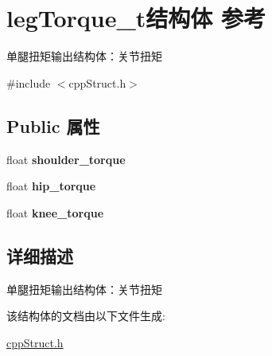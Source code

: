 \hypertarget{structlegTorque__t}{}\section{leg\+Torque\+\_\+t结构体 参考}
\label{structlegTorque__t}


单腿扭矩输出结构体：关节扭矩  




{\ttfamily \#include $<$cpp\+Struct.\+h$>$}

\subsection*{Public 属性}
\begin{DoxyCompactItemize}
\item 
\mbox{\label{structlegTorque__t_a8b64fe6767a165d0c8b97bd178584861}} 
float {\bfseries shoulder\+\_\+torque}
\item 
\mbox{\label{structlegTorque__t_afc0476c383055108073215476d80a77b}} 
float {\bfseries hip\+\_\+torque}
\item 
\mbox{\label{structlegTorque__t_aa48ce8bef8d8def4ef104417c0975247}} 
float {\bfseries knee\+\_\+torque}
\end{DoxyCompactItemize}


\subsection{详细描述}
单腿扭矩输出结构体：关节扭矩 

该结构体的文档由以下文件生成\+:\begin{DoxyCompactItemize}
\item 
\hyperlink{cppStruct_8h}{cpp\+Struct.\+h}\end{DoxyCompactItemize}
